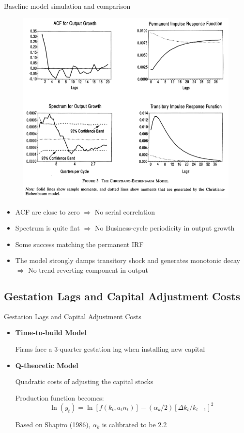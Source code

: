 \documentclass[10pt]{beamer}
\begin{document}
\begin{frame}{Baseline model simulation and comparison}
\begin{figure}
    \centering
  \includegraphics[width=0.57\linewidth]{baseline_all.png}
\end{figure}
\small
\begin{itemize}
    \item  ACF are close to zero $\Rightarrow$  No serial correlation
    \item Spectrum is quite flat $\Rightarrow$ No Business-cycle periodicity in output growth
    \item Some success matching the permanent IRF
    \item The model strongly damps transitory shock and generates monotonic decay $\Rightarrow$ No trend-reverting component in output
\end{itemize}
\end{frame}

\subsection{Gestation Lags and Capital Adjustment Costs}

\begin{frame}{Gestation Lags and Capital Adjustment Costs}

\begin{itemize}
    \item \textbf{Time-to-build Model}
    
    Firms face a 3-quarter gestation lag when installing new capital

    \item \textbf{Q-theoretic Model}
   
    Quadratic costs of adjusting the capital stocks

    Production function becomes:
    $$
\ln \left(y_t\right)= \ln \left[f\left(k_t, a_t n_t\right)\right] -\left(\alpha_{k} / 2\right)\left[\Delta k_t / k_{t-1}\right]^2
$$

Based on Shapiro (1986), $\alpha_{k}$ is calibrated to be 2.2
\end{itemize}

\end{frame}
\end{document}
